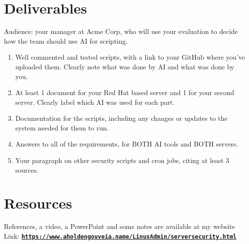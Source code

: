 \documentclass[12pt]{article}
\begin{document}
\section*{Deliverables}
Audience: your manager at Acme Corp, who will use your evaluation to decide how the team should use AI for scripting.
\begin{enumerate}
    \item Well commented and tested scripts, with a link to your GitHub where you've uploaded them. Clearly note what was done by AI and what was done by you.
    \item At least 1 document for your Red Hat based server and 1 for your second server. Clearly label which AI was used for each part.
    \item Documentation for the scripts, including any changes or updates to the system needed for them to run.
    \item Answers to all of the requirements, for BOTH AI tools and BOTH servers.
    \item Your paragraph on other security scripts and cron jobs, citing at least 3 sources.
\end{enumerate}

\section*{Resources}
References, a video, a PowerPoint and some notes are available at my website
Link: \href{https://www.aholdengouveia.name/LinuxAdmin/serversecurity.html}{\textbf{\nolinkurl{https://www.aholdengouveia.name/LinuxAdmin/serversecurity.html}}}
\end{document}
